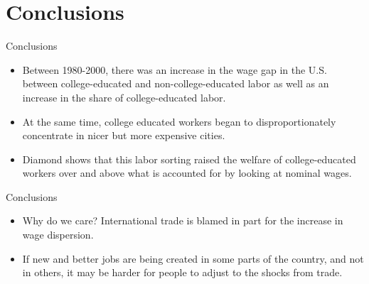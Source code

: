 \documentclass[aspectratio=169]{beamer}
\begin{document}

\section{Conclusions}


\begin{frame}{Conclusions}

\begin{itemize}
    \item<1->  Between 1980-2000, there was an increase in the wage gap in the U.S. between college-educated and non-college-educated labor as well as an increase in the share of college-educated labor.
    \item<2->  At the same time, college educated workers began to disproportionately concentrate in nicer but more expensive cities.
    \item<3->  Diamond shows that this labor sorting raised the welfare of college-educated workers over and above what is accounted for by looking at nominal wages.
\end{itemize}
    
\end{frame}


\begin{frame}{Conclusions}

\begin{itemize}
    \item<1->  Why do we care?  International trade is blamed in part for the increase in wage dispersion.
    \item<2->  If new and better jobs are being created in some parts of the country, and not in others, it may be harder for people to adjust to the shocks from trade.
\end{itemize}
    
\end{frame}

\end{document}
